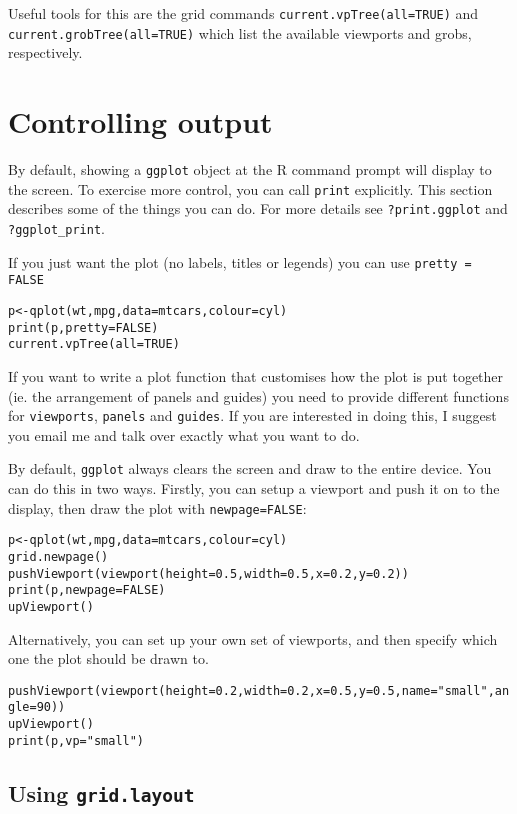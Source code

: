 Useful tools for this are the grid commands {\tt current.vpTree(all=TRUE)} and {\tt current.grobTree(all=TRUE)} which list the available viewports and grobs, respectively.  

\section{Controlling output}\label{sec:controlling_output}

By default, showing a {\tt ggplot} object at the R command prompt will display to the screen.  To exercise more control, you can call {\tt print} explicitly.  This section describes some of the things you can do.  For more details see {\tt ?print.ggplot} and {\tt ?ggplot\_print}.

If you just want the plot (no labels, titles or legends) you can use {\tt pretty = FALSE}

\begin{alltt}
p <- qplot(wt, mpg, data=mtcars, colour=cyl)
print(p, pretty = FALSE)
current.vpTree(all=TRUE)
\end{alltt}

If you want to write a plot function that customises how the plot is put together (ie. the arrangement of panels and guides) you need to provide different functions for {\tt viewports}, {\tt panels} and {\tt guides}.  If you are interested in doing this, I suggest you email me and talk over exactly what you want to do.

By default, {\tt ggplot} always clears the screen and draw to the entire device.  You can do this in two ways.  Firstly, you can setup a viewport and push it on to the display, then draw the plot with {\tt newpage=FALSE}:

\begin{alltt}
p <- qplot(wt, mpg, data=mtcars, colour=cyl)
grid.newpage()
pushViewport(viewport(height=0.5, width=0.5, x=0.2, y=0.2))
print(p, newpage=FALSE)
upViewport()
\end{alltt}

Alternatively, you can set up your own set of viewports, and then specify which one the plot should be drawn to.

\begin{alltt}
pushViewport(viewport(height=0.2, width=0.2, x=0.5, y=0.5, name="small", angle=90))
upViewport()
print(p, vp="small")
\end{alltt}

\subsection{Using {\tt grid.layout}}\label{sub:using_grid_layout}

